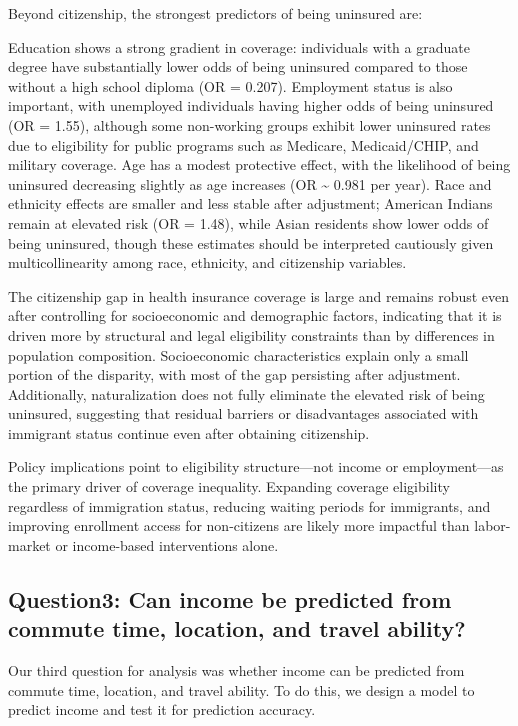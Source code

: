\documentclass[
  letterpaper,
  DIV=11,
  numbers=noendperiod]{scrartcl}
\begin{document}
Beyond citizenship, the strongest predictors of being uninsured are:

Education shows a strong gradient in coverage: individuals with a
graduate degree have substantially lower odds of being uninsured
compared to those without a high school diploma (OR = 0.207). Employment
status is also important, with unemployed individuals having higher odds
of being uninsured (OR = 1.55), although some non-working groups exhibit
lower uninsured rates due to eligibility for public programs such as
Medicare, Medicaid/CHIP, and military coverage. Age has a modest
protective effect, with the likelihood of being uninsured decreasing
slightly as age increases (OR \textasciitilde{} 0.981 per year). Race
and ethnicity effects are smaller and less stable after adjustment;
American Indians remain at elevated risk (OR = 1.48), while Asian
residents show lower odds of being uninsured, though these estimates
should be interpreted cautiously given multicollinearity among race,
ethnicity, and citizenship variables.

The citizenship gap in health insurance coverage is large and remains
robust even after controlling for socioeconomic and demographic factors,
indicating that it is driven more by structural and legal eligibility
constraints than by differences in population composition. Socioeconomic
characteristics explain only a small portion of the disparity, with most
of the gap persisting after adjustment. Additionally, naturalization
does not fully eliminate the elevated risk of being uninsured,
suggesting that residual barriers or disadvantages associated with
immigrant status continue even after obtaining citizenship.

Policy implications point to eligibility structure---not income or
employment---as the primary driver of coverage inequality. Expanding
coverage eligibility regardless of immigration status, reducing waiting
periods for immigrants, and improving enrollment access for non-citizens
are likely more impactful than labor-market or income-based
interventions alone.

\subsection{Question3: Can income be predicted from commute time,
location, and travel
ability?}\label{question3-can-income-be-predicted-from-commute-time-location-and-travel-ability}

Our third question for analysis was whether income can be predicted from
commute time, location, and travel ability. To do this, we design a
model to predict income and test it for prediction accuracy.
\end{document}

